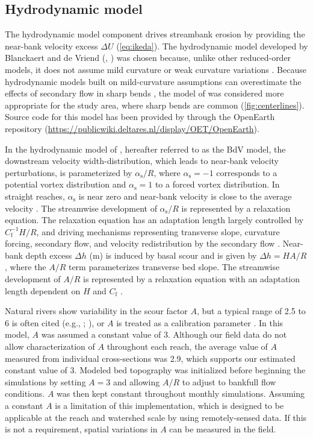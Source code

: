 \documentclass[preprint, review, authoryear, 12pt]{elsarticle}
\begin{document}
\subsection{Hydrodynamic model}\label{sec:bdv}
The hydrodynamic model component drives streambank erosion by providing the near-bank velocity excess $\Delta U$ (\cref{eq:ikeda}). The hydrodynamic model developed by Blanckaert and de Vriend (\citeyear{Blanckaert2003}, \citeyear{Blanckaert2010}) was chosen because, unlike other reduced-order models, it does not assume mild curvature or weak curvature variations \citep{Ottevanger2012}. Because hydrodynamic models built on mild-curvature assumptions can overestimate the effects of secondary flow in sharp bends \citep{Ottevanger2012}, the model of \citet{Blanckaert2010} was considered more appropriate for the study area, where sharp bends are common (\cref{fig:centerlines}). Source code for this model has been provided by \citet{Ottevanger2013} through the OpenEarth repository (\url{https://publicwiki.deltares.nl/display/OET/OpenEarth}).

In the hydrodynamic model of \citet{Blanckaert2010}, hereafter referred to as the BdV model, the downstream velocity width-distribution, which leads to near-bank velocity perturbations, is parameterized by $\alpha_\text{s}/R$, where $\alpha_\text{s}=-1$ corresponds to a potential vortex distribution and $\alpha_\text{s}=1$ to a forced vortex distribution. In straight reaches, $\alpha_\text{s}$ is near zero and near-bank velocity is close to the average velocity \citep{Blanckaert2003}. The streamwise development of $\alpha_\text{s}/R$ is represented by a relaxation equation. The relaxation equation has an adaptation length largely controlled by $C_\text{f}^{-1} H/R$, and driving mechanisms representing transverse slope, curvature forcing, secondary flow, and velocity redistribution by the secondary flow \citep[][equations 35--37]{Blanckaert2010}. Near-bank depth excess $\Delta h$ (m) is induced by basal scour and is given by $\Delta h=HA/R$, where the $A/R$ term parameterizes transverse bed slope. The streamwise development of $A/R$ is represented by a relaxation equation with an adaptation length dependent on $H$ and $C_\text{f}$ \citep[][equation 20]{Blanckaert2010}. 

Natural rivers show variability in the scour factor $A$, but a typical range of 2.5 to 6 is often cited (e.g., \citealp{Ikeda1981}; \citealp{Ottevanger2012}), or $A$ is treated as a calibration parameter \citep{Odgaard1987}. In this model, $A$ was assumed a constant value of 3. Although our field data do not allow characterization of $A$ throughout each reach, the average value of $A$ measured from individual cross-sections was 2.9, which supports our estimated constant value of $3$. Modeled bed topography was initialized before beginning the simulations by setting $A=3$ and allowing $A/R$ to adjust to bankfull flow conditions. $A$ was then kept constant throughout monthly simulations. Assuming a constant $A$ is a limitation of this implementation, which is designed to be applicable at the reach and watershed scale by using remotely-sensed data. If this is not a requirement, spatial variations in $A$ can be measured in the field.
\end{document}
